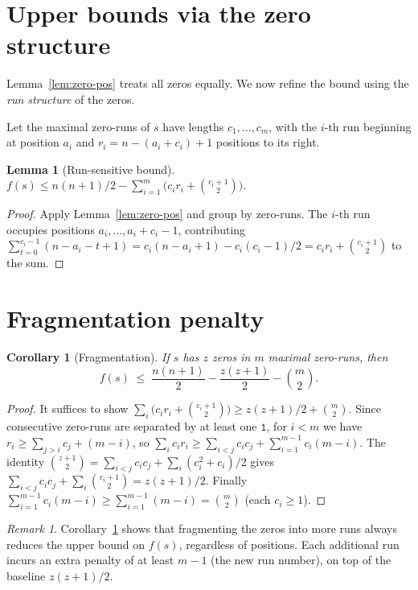 ﻿\documentclass[11pt,a4paper]{article}
\theoremstyle{plain}
\newtheorem{lemma}[theorem]{Lemma}
\newtheorem{corollary}[theorem]{Corollary}
\theoremstyle{definition}
\theoremstyle{remark}
\newtheorem{remark}[theorem]{Remark}
\begin{document}
\section{Upper bounds via the zero structure}\label{sec:zeros}

Lemma~\ref{lem:zero-pos} treats all zeros equally.  We now refine the
bound using the \emph{run structure} of the zeros.

Let the maximal zero-runs of $s$ have lengths $c_1,\ldots,c_m$, with
the $i$-th run beginning at position $a_i$ and $r_i=n-(a_i+c_i)+1$
positions to its right.

\begin{lemma}[Run-sensitive bound]\label{lem:runs-raw}
$f(s)\le n(n+1)/2-\sum_{i=1}^m\bigl(c_i r_i+\binom{c_i+1}{2}\bigr)$.
\end{lemma}

\begin{proof}
Apply Lemma~\ref{lem:zero-pos} and group by zero-runs.
The $i$-th run occupies positions $a_i,\ldots,a_i+c_i-1$, contributing
$\sum_{t=0}^{c_i-1}(n-a_i-t+1)=c_i(n-a_i+1)-c_i(c_i-1)/2
=c_i r_i+\binom{c_i+1}{2}$ to the sum.
\end{proof}

\section{Fragmentation penalty}\label{sec:runs}

\begin{corollary}[Fragmentation]\label{cor:fragment}
If $s$ has $z$ zeros in $m$ maximal zero-runs, then
\[
  f(s)\;\le\;\frac{n(n+1)}{2}-\frac{z(z+1)}{2}-\binom{m}{2}.
\]
\end{corollary}

\begin{proof}
It suffices to show
$\sum_i\bigl(c_i r_i+\binom{c_i+1}{2}\bigr)\ge z(z+1)/2+\binom{m}{2}$.
Since consecutive zero-runs are separated by at least one $\mathtt{1}$,
for $i<m$ we have $r_i\ge\sum_{j>i}c_j+(m-i)$, so
$\sum_i c_i r_i\ge\sum_{i<j}c_i c_j+\sum_{i=1}^{m-1}c_i(m-i)$.
The identity $\binom{z+1}{2}=\sum_{i<j}c_i c_j+\sum_i(c_i^2+c_i)/2$ gives
$\sum_{i<j}c_i c_j+\sum_i\binom{c_i+1}{2}=z(z+1)/2$.
Finally $\sum_{i=1}^{m-1}c_i(m-i)\ge\sum_{i=1}^{m-1}(m-i)=\binom{m}{2}$
(each $c_i\ge1$).
\end{proof}

\begin{remark}
Corollary~\ref{cor:fragment} shows that fragmenting the zeros into more
runs always reduces the upper bound on $f(s)$, regardless of positions.
Each additional run incurs an extra penalty of at least $m-1$ (the new
run number), on top of the baseline $z(z+1)/2$.
\end{remark}
\end{document}
